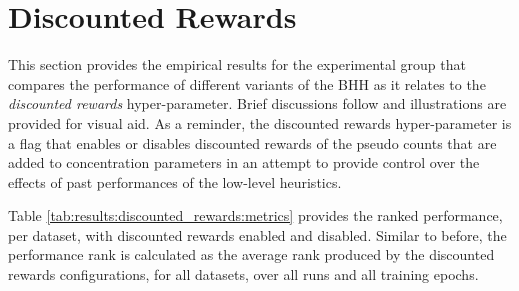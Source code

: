 
\section{Discounted Rewards}\label{sec:results:discounted_rewards}

This section provides the empirical results for the experimental group that compares the performance of different variants of the \acs{BHH} as it relates to the \textit{discounted rewards} hyper-parameter. Brief discussions follow and illustrations are provided for visual aid. As a reminder, the discounted rewards hyper-parameter is a flag that enables or disables discounted rewards of the pseudo counts that are added to concentration parameters in an attempt to provide control over the effects of past performances of the low-level heuristics.

Table \ref{tab:results:discounted_rewards:metrics} provides the ranked performance, per dataset, with discounted rewards enabled and disabled. Similar to before, the performance rank is calculated as the average rank produced by the discounted rewards configurations, for all datasets, over all runs and all training epochs.

